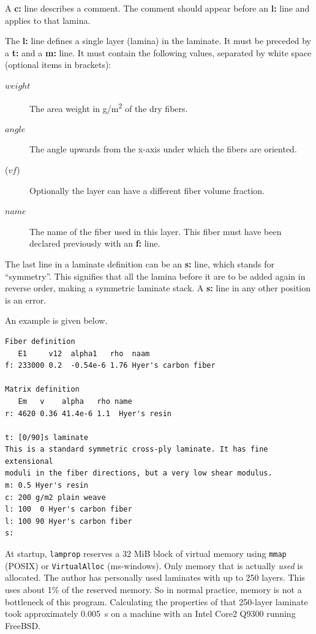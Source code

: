 \documentclass[a4paper,landscape,oneside,11pt,twocolumn]{memoir}
\begin{document}
A \textbf{c:} line describes a comment. The comment should appear before an
\textbf{l:} line and applies to that lamina.

The \textbf{l:} line defines a single layer (lamina) in the laminate. It must be
preceded by a \textbf{t:} and a \textbf{m:} line. It must contain the following values,
separated by white space (optional items in brackets):
\begin{description}
    \item[$weight$] The area weight in \si{g/m^2} of the dry fibers.
    \item[$angle$] The angle upwards from the x-axis under which the fibers are oriented.
    \item[($vf$)] Optionally the layer can have a different fiber volume fraction.
    \item[$name$] The name of the fiber used in this layer. This fiber must have been
        declared previously with an \textbf{f:} line.
\end{description}

The last line in a laminate definition can be an \textbf{s:} line, which stands
for ``symmetry''. This signifies that all the lamina before it are to be added
again in reverse order, making a symmetric laminate stack. A \textbf{s:} line in any
other position is an error.

An example is given below.
\begin{lstlisting}[style=plain]
Fiber definition
   E1     v12  alpha1   rho  naam
f: 233000 0.2  -0.54e-6 1.76 Hyer's carbon fiber

Matrix definition
   Em   v    alpha   rho name
r: 4620 0.36 41.4e-6 1.1  Hyer's resin

t: [0/90]s laminate
This is a standard symmetric cross-ply laminate. It has fine extensional
moduli in the fiber directions, but a very low shear modulus.
m: 0.5 Hyer's resin
c: 200 g/m2 plain weave
l: 100  0 Hyer's carbon fiber
l: 100 90 Hyer's carbon fiber
s:
\end{lstlisting}

At startup, \texttt{lamprop} reserves a 32 MiB block of virtual memory using
\texttt{mmap} (POSIX) or \texttt{VirtualAlloc} (ms-windows).
Only memory that is actually \emph{used} is allocated.
The author has personally used laminates with up to 250 layers.
This uses about 1\% of the reserved memory.
So in normal practice, memory is not a bottleneck of this program.
Calculating the properties of that 250-layer laminate took approximately
\SI{0.005}{s} on a machine with an Intel Core2 Q9300 running FreeBSD.
\end{document}
